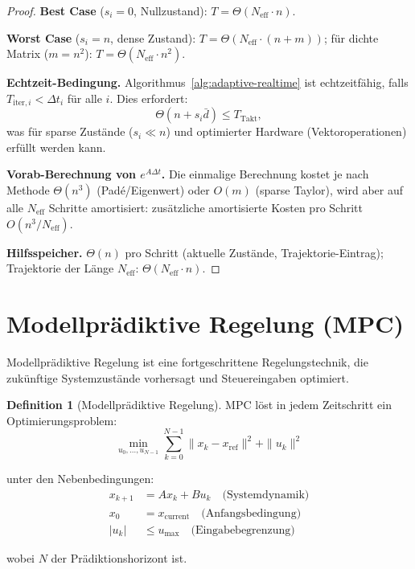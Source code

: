 \documentclass[a4paper,12pt]{report}
\theoremstyle{definition}
\newtheorem{definition}{Definition}
\begin{document}
\begin{proof}
		\textbf{Best Case} ($s_i = 0$, Nullzustand): $T = \Theta(N_{\mathrm{eff}} \cdot n)$.

		\textbf{Worst Case} ($s_i = n$, dense Zustand): $T = \Theta(N_{\mathrm{eff}} \cdot (n + m))$; für dichte Matrix ($m = n^2$): $T = \Theta(N_{\mathrm{eff}} \cdot n^2)$.

		\textbf{Echtzeit-Bedingung.} Algorithmus~\ref{alg:adaptive-realtime} ist echt\-zeitfähig, falls $T_{\mathrm{iter},i} < \Delta t_i$ für alle $i$. Dies erfordert:
		\[
			\Theta(n + s_i \bar{d}) \leq T_{\mathrm{Takt}},
		\]
		was für sparse Zustände ($s_i \ll n$) und optimierter Hardware (Vektoroperationen) erfüllt werden kann.

		\textbf{Vorab-Berechnung von $e^{A\Delta t}$.} Die einmalige Berechnung kostet je nach Methode $\Theta(n^3)$ (Padé/Eigenwert) oder $O(m)$ (sparse Taylor), wird aber auf alle $N_{\mathrm{eff}}$ Schritte amortisiert: zusätzliche amortisierte Kosten pro Schritt $O(n^3 / N_{\mathrm{eff}})$.

		\textbf{Hilfsspeicher.} $\Theta(n)$ pro Schritt (aktuelle Zustände, Trajektorie-Eintrag); Trajektorie der Länge $N_{\mathrm{eff}}$: $\Theta(N_{\mathrm{eff}} \cdot n)$.
	\end{proof}

	\section{Modellprädiktive Regelung (MPC)}
	
	Modellprädiktive Regelung ist eine fortgeschrittene Regelungstechnik, die zukünftige Systemzustände vorhersagt und Steuereingaben optimiert.
	
	\begin{definition}[Modellprädiktive Regelung]
		MPC löst in jedem Zeitschritt ein Optimierungsproblem:
		\[
		\min_{u_0, \ldots, u_{N-1}} \sum_{k=0}^{N-1} \|x_k - x_{\text{ref}}\|^2 + \|u_k\|^2
		\]
		
		unter den Nebenbedingungen:
		\begin{align}
			x_{k+1} &= A x_k + B u_k \quad \text{(Systemdynamik)} \\
			x_0 &= x_{\text{current}} \quad \text{(Anfangsbedingung)} \\
			|u_k| &\leq u_{\text{max}} \quad \text{(Eingabebegrenzung)}
		\end{align}
		
		wobei $N$ der Prädiktionshorizont ist.
	\end{definition}
	
\end{document}
